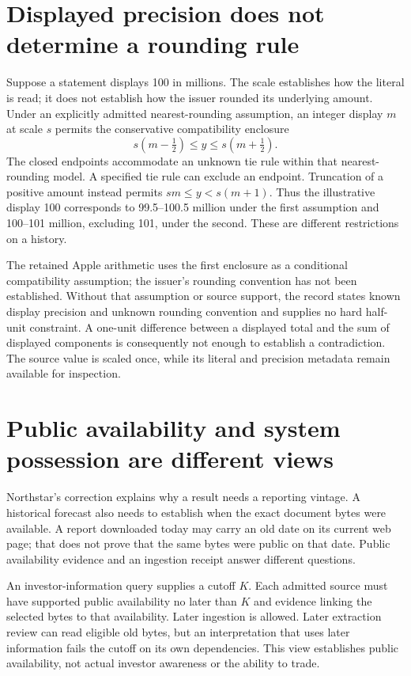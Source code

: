 \section{Displayed precision does not determine a rounding rule}
\label{sec:source-rounding}

Suppose a statement displays 100 in millions. The scale establishes how the
literal is read; it does not establish how the issuer rounded its underlying
amount. Under an explicitly admitted nearest-rounding assumption, an integer
display $m$ at scale $s$ permits the conservative compatibility enclosure
\[
       s(m-\tfrac12)\leq y\leq s(m+\tfrac12).
\]
The closed endpoints accommodate an unknown tie rule within that nearest-rounding
model. A specified tie rule can exclude an endpoint. Truncation of a positive
amount instead permits $sm\leq y<s(m+1)$. Thus the illustrative display 100
corresponds to 99.5--100.5 million under the first assumption and 100--101 million,
excluding 101, under the second. These are different restrictions on a history.

The retained Apple arithmetic uses the first enclosure as a conditional
compatibility assumption; the issuer's rounding convention has not been
established. Without that assumption or source support, the record states
known display precision and unknown rounding convention and supplies no hard
half-unit constraint. A one-unit difference between a displayed total and the
sum of displayed components is consequently not enough to establish a
contradiction. The source value is scaled once, while its literal and precision
metadata remain available for inspection.

\section{Public availability and system possession are different views}
\label{sec:time-admission}

Northstar's correction explains why a result needs a reporting vintage. A
historical forecast also needs to establish when the exact document bytes were
available. A report downloaded today may carry an old date on its current web
page; that does not prove that the same bytes were public on that date. Public
availability evidence and an ingestion receipt answer different questions.

An investor-information query supplies a cutoff $K$. Each admitted source must
have supported public availability no later than $K$ and evidence linking the
selected bytes to that availability. Later ingestion is allowed. Later
extraction review can read eligible old bytes, but an interpretation that uses
later information fails the cutoff on its own dependencies. This view establishes
public availability, not actual investor awareness or the ability to trade.

